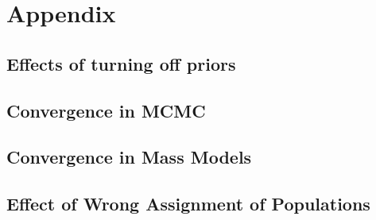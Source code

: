 \section{Appendix}
\subsection{Effects of turning off priors}
\subsection{Convergence in MCMC}
\subsection{Convergence in Mass Models}
\subsection{Effect of Wrong Assignment of Populations}